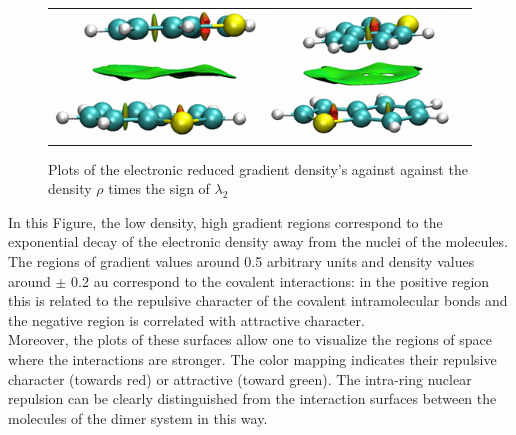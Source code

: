 \begin{figure}[H]
\begin{center}
\begin{tabular}{c c c}
					\includegraphics{image/image/P1-F861} & \includegraphics{image/image/P1-F862} & \\
				\end{tabular}
			\end{center}
			\caption{Plots of the electronic reduced gradient density's against against the density $\rho$ times the sign of $\lambda_{2}$} \label{P1-F8}
		\end{figure}
		
		In this Figure, the low density, high gradient regions correspond to the exponential decay of the electronic density away from the nuclei of the molecules. The regions of gradient values around 0.5 arbitrary units and density values around $\pm$ 0.2 au correspond to the covalent interactions: in the positive region this is related to the repulsive character of the covalent intramolecular bonds and the negative region is correlated with attractive character.\\
		
		Moreover, the plots of these surfaces allow one to visualize the regions of space where the interactions are stronger. The color mapping indicates their repulsive character (towards red) or attractive (toward green). The intra-ring nuclear repulsion can be clearly distinguished from the interaction surfaces between the molecules of the dimer system in this way.\\
		
